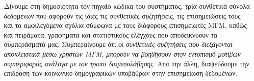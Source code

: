 Δίνουμε στη δημοσιότητα τον πηγαίο κώδικα του συστήματος, τρία συνθετικά σύνολα δεδομένων που αφορούν τις ίδιες τις συνθετικές συζητήσεις, τις επισημειώσεις τους και τα αμφιλεγόμενα σχόλια σύμφωνα με τους διάφορους επισημειωτές ΜΓΜ, καθώς και πειράματα, γραφήματα και στατιστικούς ελέγχους που αποδεικνύουν τα συμπεράσματά μας. Συμπεραίνουμε ότι \textit{οι συνθετικές συζητήσεις που διεξάγονται αποκλειστικά μέσω χρηστών ΜΓΜ, μπορούν να βοηθήσουν στον εντοπισμό μοτίβων συμπεριφοράς ανάλογα με τον τροπο διαμεσολάβησης}. Από την άλλη, διαψεύδουμε την επίδραση των κοινωνικο-δημογραφικών υποβάθρων στην επισημείωση δεδομένων.

